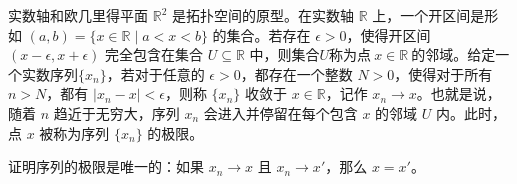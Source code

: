 实数轴和欧几里得平面 $\mathbb{R}^{2}$ 是拓扑空间的原型。在实数轴 $\mathbb{R}$ 上，一个开区间是形如 $(a,b)=\{x\in \mathbb{R} \mid a< x< b\}$ 的集合。若存在 $\epsilon  >0$，使得开区间 $(x-\epsilon ,x+\epsilon )$ 完全包含在集合 $U\subseteq \mathbb{R}$ 中，则集合$U$称为点$\ x\in \mathbb{R} \ $的邻域。给定一个实数序列$\{x_{n} \}$，若对于任意的 $\epsilon  >0$，都存在一个整数 $N >0$，使得对于所有 $n >N$，都有 $|x_{n} -x|< \epsilon $，则称 $\{x_{n} \}$ 收敛于 $x\in \mathbb{R}$，记作 $x_{n}\rightarrow x$。也就是说，随着 $ n$ 趋近于无穷大，序列 $x_{n}$ 会进入并停留在每个包含 $x$ 的邻域 $U$ 内。此时，点 $x$ 被称为序列 $\{x_{n} \}$ 的极限。

\begin{exercise}
    证明序列的极限是唯一的：如果 $x_{n}\rightarrow x$ 且 $x_{n}\rightarrow x'$，那么 $x=x'$。
\end{exercise}

